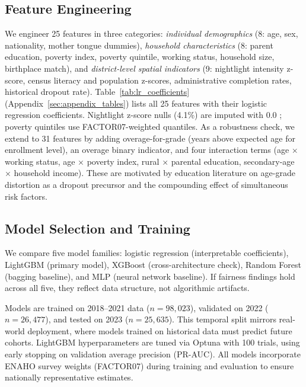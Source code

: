 \documentclass[notitlepage,12pt]{jedm}
\begin{document}
\subsection{Feature Engineering}

We engineer 25 features in three categories: \emph{individual demographics} (8: age, sex, nationality, mother tongue dummies), \emph{household characteristics} (8: parent education, poverty index, poverty quintile, working status, household size, birthplace match), and \emph{district-level spatial indicators} (9: nightlight intensity z-score, census literacy and population z-scores, administrative completion rates, historical dropout rate). Table~\ref{tab:lr_coefficients} (Appendix~\ref{sec:appendix_tables}) lists all 25 features with their logistic regression coefficients. Nightlight z-score nulls (4.1\%) are imputed with 0.0 \cite{macnell2023implementing}; poverty quintiles use FACTOR07-weighted quantiles. As a robustness check, we extend to 31 features by adding overage-for-grade (years above expected age for enrollment level), an overage binary indicator, and four interaction terms (age $\times$ working status, age $\times$ poverty index, rural $\times$ parental education, secondary-age $\times$ household income). These are motivated by education literature on age-grade distortion as a dropout precursor and the compounding effect of simultaneous risk factors.

\subsection{Model Selection and Training}

We compare five model families: logistic regression (interpretable coefficients), LightGBM \cite{ke2017lightgbm} (primary model), XGBoost \cite{chen2016xgboost} (cross-architecture check), Random Forest (bagging baseline), and MLP (neural network baseline). If fairness findings hold across all five, they reflect data structure, not algorithmic artifacts.

Models are trained on 2018--2021 data ($n=98{,}023$), validated on 2022 ($n=26{,}477$), and tested on 2023 ($n=25{,}635$). This temporal split mirrors real-world deployment, where models trained on historical data must predict future cohorts. LightGBM hyperparameters are tuned via Optuna \cite{akiba2019optuna} with 100 trials, using early stopping on validation average precision (PR-AUC). All models incorporate ENAHO survey weights (FACTOR07) during training and evaluation to ensure nationally representative estimates.
\end{document}
